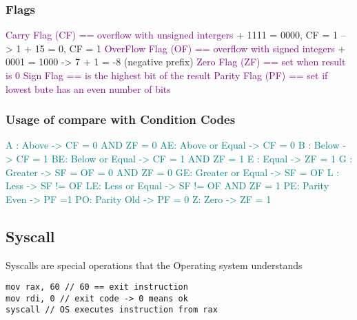 \documentclass[main.tex,fontsize=8pt,paper=a4,paper=landscape,DIV=calc,]{scrartcl}
\begin{document}
\begin{multicols*}{4}
\subsubsection{Flags}
\textcolor{purple}{Carry Flag (CF) == overflow with unsigned intergers} + 1111 = 0000, CF = 1 --> 1 + 15 = 0, CF = 1
\textcolor{purple}{OverFlow Flag (OF) == overflow with signed integers} + 0001 = 1000 -> 7 + 1 = -8 (negative prefix)
\textcolor{purple}{Zero Flag (ZF) == set when result is 0}
\textcolor{purple}{Sign Flag == is the highest bit of the result}
\textcolor{purple}{Parity Flag (PF) == set if lowest bute has an even number of bits}

\subsubsection{Usage of compare with Condition Codes}
\textcolor{teal}{A : Above } \textcolor{teal}{ -> CF = 0 AND ZF = 0}\newline
\textcolor{teal}{AE: Above or Equal } \textcolor{teal}{ -> CF = 0}\newline
\textcolor{teal}{B : Below } \textcolor{teal}{ -> CF = 1}\newline
\textcolor{teal}{BE: Below or Equal } \textcolor{teal}{ -> CF = 1 AND ZF = 1}\newline
\textcolor{teal}{E : Equal } \textcolor{teal}{ -> ZF = 1}\newline
\textcolor{teal}{G : Greater } \textcolor{teal}{ -> SF = OF = 0 AND ZF = 0}\newline
\textcolor{teal}{GE: Greater or Equal } \textcolor{teal}{ -> SF = OF}\newline
\textcolor{teal}{L : Less } \textcolor{teal}{ -> SF != OF}\newline
\textcolor{teal}{LE: Less or Equal } \textcolor{teal}{ -> SF != OF AND ZF = 1}\newline
\textcolor{teal}{PE: Parity Even}  \textcolor{teal}{ -> PF =1}\newline
\textcolor{teal}{PO: Parity Old } \textcolor{teal}{ -> PF = 0}\newline
\textcolor{teal}{Z:  Zero} \textcolor{teal}{ -> ZF = 1}

\subsection{Syscall}
Syscalls are special operations that the Operating system understands
\begin{lstlisting}
mov rax, 60 // 60 == exit instruction
mov rdi, 0 // exit code -> 0 means ok
syscall // OS executes instruction from rax
\end{lstlisting}
\vspace{2mm}


\end{multicols*}
\end{document}
